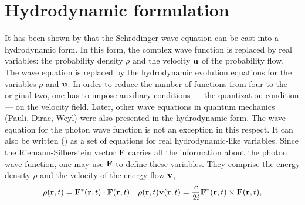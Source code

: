 \documentclass{article}
\begin{document}
\section{Hydrodynamic formulation\label{hydrodynamic}}

It has been shown by \cite{Madelung_26} that the Schr\"odinger wave equation
can be cast into a hydrodynamic form. In this form, the complex wave
function is replaced by real variables: the probability density $\rho$ and
the velocity ${\bf u}$ of the probability flow. The wave equation is
replaced by the hydrodynamic evolution equations for the variables $\rho$
and ${\bf u}$. In order to reduce the number of functions from four to the
original two, one has to impose auxiliary conditions --- the quantization
condition --- on the velocity field. Later, other wave equations in quantum
mechanics (Pauli, Dirac, Weyl) were also presented in the hydrodynamic form.
The wave equation for the photon wave function is not an exception in this
respect. It can also be written (\cite{IBB_96b}) as a set of equations for
real hydrodynamic-like variables. Since the Riemann-Silberstein vector ${\bf
F}$ carries all the information about the photon wave function, one may use
${\bf F}$ to define these variables. They comprise the energy density $\rho$
and the velocity of the energy flow ${\bf v}$,
\begin{eqnarray}
 \rho({\bf r},t) = {\bf F}^*({\bf r},t)\cdot{\bf F}({\bf r},t),\;\;
 \rho({\bf r},t){\bf v}({\bf r},t)
 = \frac{c}{2i}{\bf F}^*({\bf r},t)\times{\bf F}({\bf r},t),
\end{eqnarray}
\end{document}
